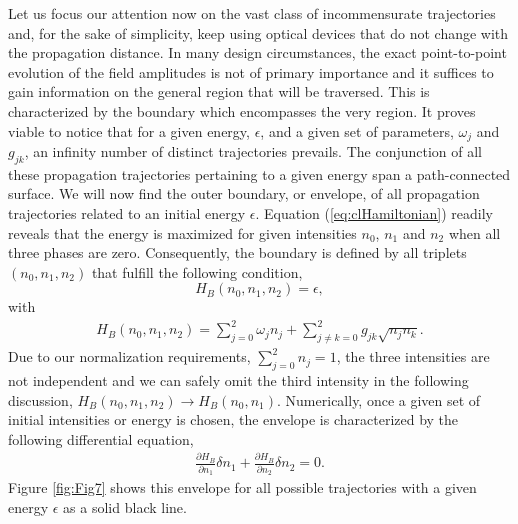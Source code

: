 \documentclass[9pt,twocolumn,twoside]{osajnl}
\begin{document}
Let us focus our attention now on the vast class of incommensurate trajectories and, for the sake of simplicity, keep using optical devices that do not change with the propagation distance.
In many design circumstances, the exact point-to-point evolution of the field amplitudes is not of primary importance and it suffices to gain information on the general region that will be traversed. 
This is characterized by the boundary which encompasses the very region. 
It proves viable to notice that for a given energy, $\epsilon$, and a given set of parameters, $\omega_{j}$ and $g_{jk}$, an infinity number of distinct trajectories prevails.
The conjunction of all these propagation trajectories pertaining to a given energy span a path-connected surface.
We will now find the outer boundary, or envelope, of all propagation trajectories related to an initial energy $\epsilon$.
Equation (\ref{eq:clHamiltonian}) readily reveals that the energy is maximized for given intensities $n_0$, $n_1$ and $n_2$ when all three phases are zero. 
Consequently, the boundary is defined by all triplets $\left( n_0,n_1,n_2 \right)$ that fulfill the following condition,
\begin{equation}
	H_{B}(n_0,n_1,n_2) = \epsilon,	
\end{equation}
with 
\begin{eqnarray}
H_{B}(n_0,n_1,n_2) = \sum_{j=0}^{2} \omega_{j} n_{j}  
	+ \sum_{j \neq k = 0}^{2} g_{jk} \sqrt{n_{j} n_{k}}.
\end{eqnarray}
Due to our normalization requirements, $\sum_{j=0}^{2} n_{j} = 1$, the three intensities are not independent and we can safely omit the third intensity in the following discussion,  
$H_{B}(n_0,n_1,n_2) \rightarrow H_{B}(n_0,n_1)$.
Numerically, once a given set of initial intensities or energy is chosen, the envelope is characterized by the following differential equation,
\begin{eqnarray}
	\frac{\partial H_{B}}{\partial n_1}\delta n_1 + 
	\frac{\partial H_{B}}{\partial n_2}\delta n_2 = 0.
\end{eqnarray}
Figure \ref{fig:Fig7} shows this envelope for all possible trajectories with a given energy $\epsilon$ as a solid black line.
\end{document}
